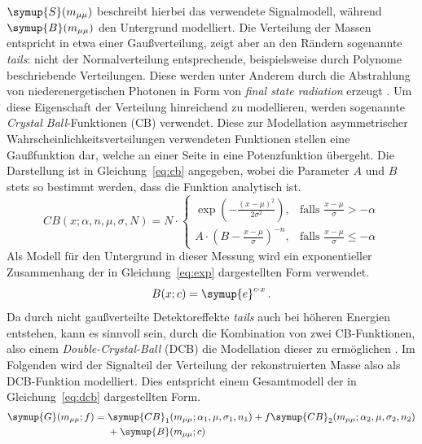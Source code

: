 $\symup{S}(m_{\mu\mu})$ beschreibt hierbei das verwendete Signalmodell, während $\symup{B}(m_{\mu\mu})$ den Untergrund modelliert. Die Verteilung der Massen entspricht in etwa einer Gaußverteilung, zeigt aber an den Rändern sogenannte \textit{tails}: nicht der Normalverteilung entsprechende, beispielsweise durch Polynome beschriebende Verteilungen. Diese werden unter Anderem durch die Abstrahlung von niederenergetischen Photonen in Form von \textit{final state radiation} erzeugt \cite{cb}. Um diese Eigenschaft der Verteilung hinreichend zu modellieren, werden sogenannte \textit{Crystal Ball}-Funktionen (CB) verwendet. Diese zur Modellation asymmetrischer Wahrscheinlichkeitsverteilungen verwendeten Funktionen stellen eine Gaußfunktion dar, welche an einer Seite in eine Potenzfunktion übergeht. Die Darstellung ist in Gleichung~\ref{eq:cb} \cite{cb} angegeben, wobei die Parameter $A$ und $B$ stets so bestimmt werden, dass die Funktion analytisch ist.
%
\begin{equation}
  {\displaystyle CB(x;\alpha ,n,{\mu},\sigma,N)=N\cdot {\begin{cases}\exp \left(-{\frac {(x-{\mu})^{2}}{2\sigma ^{2}}}\right),&{\mbox{falls }}{\frac {x-{\mu}}{\sigma }}>-\alpha \\A\cdot \left(B-{\frac {x-{\mu}}{\sigma }}\right)^{-n},&{\mbox{falls }}{\frac {x-{\mu}}{\sigma }}\leqslant -\alpha \end{cases}}}
  \label{eq:cb}
\end{equation}
%
Als Modell für den Untergrund in dieser Messung wird ein exponentieller Zusammenhang der in Gleichung~\ref{eq:exp} dargestellten Form verwendet.
%
\begin{equation}
  B(x; c)= \symup{e}^{c\cdot x} \, .
  \label{eq:exp}
\end{equation}
%
Da durch nicht gaußverteilte Detektoreffekte \textit{tails} auch bei höheren Energien entstehen, kann es sinnvoll sein, durch die Kombination von zwei CB-Funktionen, also einem \textit{Double-Crystal-Ball} (DCB) die Modellation dieser zu ermöglichen \cite{ipatia}.
Im Folgenden wird der Signalteil der Verteilung der rekonstruierten Masse also als DCB-Funktion modelliert. Dies entspricht einem Gesamtmodell der in Gleichung~\ref{eq:dcb} dargestellten Form.
%
\begin{equation}
  \begin{split}
  \symup{G}(m_{\mu\mu}; f)={}&\symup{CB}_1(m_{\mu\mu};\alpha_1,\mu,\sigma_1,n_1) + f\symup{CB}_2(m_{\mu\mu};\alpha_2,\mu,\sigma_2,n_2)\\ &+ \symup{B}(m_{\mu\mu};c)
  \end{split}
  \label{eq:dcb}
\end{equation}
